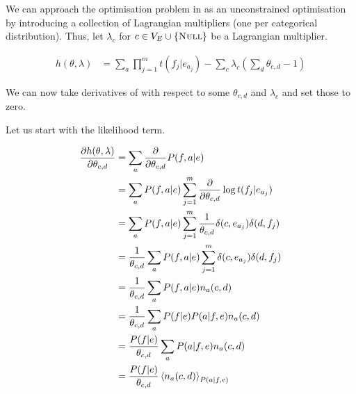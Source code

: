 We can approach the optimisation problem in  as an unconstrained optimisation by introducing a collection of Lagrangian multipliers (one per categorical distribution).
Thus, let $\lambda_c$ for $c \in V_E \cup \{\textsc{Null}\}$ be a Lagrangian multiplier.

\begin{align}\label{eq:MLE1Lag}
h(\theta, \lambda) &= \sum_a \prod_{j=1}^m t(f_j|e_{a_j}) - \sum_c \lambda_c \left( \sum_d \theta_{c,d} - 1 \right)
\end{align}

We can now take derivatives of  with respect to some $\theta_{c,d}$ and $\lambda_c$ and set those to zero.

Let us start with the likelihood term.

\begin{align}
\partiald{h(\theta,\lambda)}{\theta_{c,d}} 
	&= \sum_a \sidepartial{P(f,a|e)}{\theta_{c,d}} \label{eq:D1Prod} \\
	&= \sum_a P(f,a|e) \sum_{j=1}^m \sidepartial{\log t(f_j|e_{a_j})}{\theta_{c,d}} \label{eq:D1LogId}\\
	&= \sum_a P(f,a|e) \sum_{j=1}^m \frac{1}{\theta_{c,d}} \delta(c, e_{a_j}) \delta(d, f_j) \label{eq:D1LogDer}\\
	&= \frac{1}{\theta_{c,d}} \sum_a P(f,a|e) \sum_{j=1}^m \delta(c, e_{a_j}) \delta(d, f_j) \label{eq:D1ThetaCD}\\
	&= \frac{1}{\theta_{c,d}} \sum_a P(f,a|e) n_a(c,d) \label{eq:D1Count}\\
	&= \frac{1}{\theta_{c,d}} \sum_a P(f|e) P(a|f,e) n_a(c,d)  \label{eq:D1ChainRule}\\
	&= \frac{P(f|e)}{\theta_{c,d}} \sum_a P(a|f,e) n_a(c,d)   \label{eq:D1PFE} \\
	&= \frac{P(f|e)}{\theta_{c,d}} \expec{n_a(c,d)}{P(a|f,e)} \label{eq:D1Expec}
\end{align}

